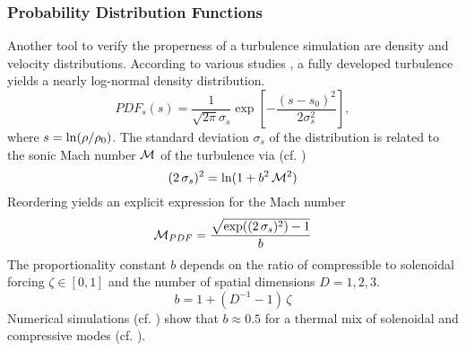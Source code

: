 \subsubsection{Probability Distribution Functions}
\label{sec:theory-density-pdf}
Another tool to verify the properness of a turbulence simulation are density
and velocity distributions. According to various studies
\cite{federrath_klessen_schmidt_2008,hopkins_2013,1999intuconf218N,0004-637X-761-2-149},
a fully developed turbulence yields a nearly log-normal density
distribution.
\begin{equation}
\label{eqn:density-pdf}
PDF_s(s) = \frac{1}{\sqrt{2\pi}\sigma_s} \exp\left[-\frac{(s-s_0)^2}{2\sigma_s^2}\right],
\end{equation}
where $s = \ln(\rho/\rho_0)$. The standard deviation $\sigma_s$ of
the distribution is related to the sonic Mach number $\mathcal{M}$ of the
turbulence via (cf. \cite{federrath_klessen_schmidt_2008,0004-637X-761-2-149})
\begin{equation}
(2\,\sigma_s)^2 = \ln(1 + b^2\,\mathcal{M}^2)
\end{equation}
Reordering yields an explicit expression for the Mach number
\begin{equation}
\label{eqn:density-pdf-mach}
\mathcal{M}_{PDF} = \frac{\sqrt{\exp((2\,\sigma_s)^2) - 1}}{b}
\end{equation}
The proportionality constant $b$ depends on the ratio of compressible to
solenoidal forcing $\zeta \in [0,1]$ and the number of spatial
dimensions $D = 1,2,3$.
\begin{equation}
\label{eqn:density-pdf-mach-constant}
b = 1 + (D^{-1} - 1) \, \zeta
\end{equation}
Numerical simulations (cf. \cite{padoan2002stellar}) show that $b \approx 0.5$
for a thermal mix of solenoidal and compressive modes (cf. ).
